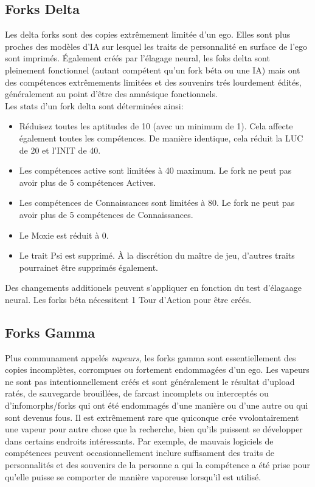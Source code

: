 \subsection{Forks Delta} 

Les delta forks sont des copies extrêmement limitée d'un ego. Elles sont plus proches des modèles d'IA sur lesquel les traits de personnalité en surface de l'ego sont imprimés. Également créés par l'élagage neural, les foks delta sont pleinement fonctionnel (autant compétent qu'un fork béta ou une IA) mais ont des compétences extrêmements limitées et des souvenirs trés lourdement édités, généralement au point d'être des amnésique fonctionnels. \\ Les stats d'un fork delta sont déterminées ainsi: 

\begin{itemize} \item Réduisez toutes les aptitudes de 10 (avec un minimum de 1). Cela affecte également toutes les compétences. De manière identique, cela réduit la LUC de 20 et l'INIT de 40. \item Les compétences active sont limitées à 40 maximum. Le fork ne peut pas avoir plus de 5 compétences Actives. 

\item Les compétences de Connaissances sont limitées à 80. Le fork ne peut pas avoir plus de 5 compétences de Connaissances. \item Le Moxie est réduit à 0. \item Le trait Psi est supprimé. À la discrétion du maître de jeu, d'autres traits pourrainet être supprimés également. \end{itemize} 

Des changements additionels peuvent s'appliquer en fonction du test d'élagaage neural. Les forks béta nécessitent 1 Tour d'Action pour être créés. 

\subsection{Forks Gamma} 

Plus communament appelés \textit{vapeurs,} les forks gamma sont essentiellement des copies incomplètes, corrompues ou fortement endommagées d'un ego. Les vapeurs ne sont pas intentionnellement créés et sont généralement le résultat d'upload ratés, de sauvegarde brouillées, de farcast incomplets ou interceptés ou d'infomorphs/forks qui ont été endommagés d'une manière ou d'une autre ou qui sont devenus fous. Il est extrêmement rare que quiconque crée vvolontairement une vapeur pour autre chose que la recherche, bien qu'ils puissent se développer dans certains endroits intéressants. Par exemple, de mauvais logiciels de compétences peuvent occasionnellement inclure suffisament des traits de personnalités et des souvenirs de la personne a qui la compétence a été prise pour qu'elle puisse se comporter de manière vaporeuse lorsqu'il est utilisé. 

